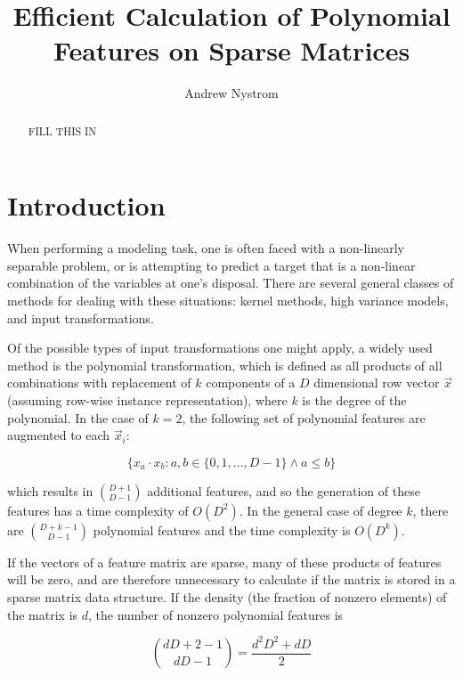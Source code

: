 \documentclass[11pt]{article}
\begin{document}
\title{Efficient Calculation of Polynomial Features on Sparse Matrices}
\author{Andrew Nystrom}
\date{}

\maketitle

\begin{abstract}%
FILL THIS IN
\end{abstract}

\section{Introduction}
When performing a modeling task, one is often faced with a non-linearly separable problem,
or is attempting to predict a target that is a non-linear combination of the variables at one's disposal.
There are several general classes of methods for dealing with these situations: kernel methods, 
high variance models, and input transformations.

Of the possible types of input transformations one
might apply, a widely used method is the polynomial transformation, which is defined as 
all products of all combinations with replacement of $k$ components of a $D$ dimensional row vector $\vec{x}$ (assuming row-wise instance representation), where $k$ is the degree of the polynomial.
In the case of $k=2$, the following set of polynomial features are augmented to each $\vec{x}_i$:

\begin{equation}
\{x_a \cdot x_b : a, b \in \{0,1,..., D-1\} \land a \le b\}
\end{equation}

which results in $\binom{D+1}{D-1}$ additional features, and so the generation of 
these features has a time complexity of $O(D^2)$. In the general case of degree $k$, there 
are $\binom{D+k-1}{D-1}$ polynomial features and the time complexity is $O(D^k)$.

If the vectors of a feature matrix are sparse, many of these products of features will be
zero, and are therefore unnecessary to calculate if the matrix is stored in a sparse matrix 
data structure. If the density (the fraction of nonzero elements) of the matrix is $d$,
the number of nonzero polynomial features is

\begin{equation}
\binom{dD+2-1}{dD-1} = \frac{d^2D^2+dD}{2}
\end{equation}
\end{document}

